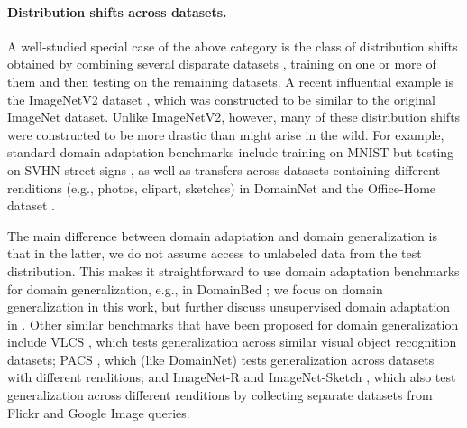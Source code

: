 \paragraph{Distribution shifts across datasets.} A well-studied special case of the above category is the class of distribution shifts obtained by combining several disparate datasets \citep{torralba2011unbiased}, training on one or more of them and then testing on the remaining datasets.
A recent influential example is the ImageNetV2 dataset \citep{recht2019doimagenet}, which was constructed to be similar to the original ImageNet dataset.
Unlike ImageNetV2, however, many of these distribution shifts were constructed to be more drastic than might arise in the wild.
For example, standard domain adaptation benchmarks include training on MNIST but testing on SVHN street signs \citep{lecun1998mnist,netzer2011reading,tzeng2017domain,hoffman2018cycada},
as well as transfers across datasets containing different renditions (e.g., photos, clipart, sketches) in DomainNet \citep{peng2019moment} and the Office-Home dataset \citep{venkateswara2017deep}.

The main difference between domain adaptation and domain generalization is that in the latter, we do not assume access to unlabeled data from the test distribution.
This makes it straightforward to use domain adaptation benchmarks for domain generalization, e.g., in DomainBed \citep{gulrajani2020search}; we focus on domain generalization in this work,
but further discuss unsupervised domain adaptation in .
Other similar benchmarks that have been proposed for domain generalization include VLCS \citep{fang2013unbiased}, which tests generalization across similar visual object recognition datasets; PACS \citep{li2017deeper}, which (like DomainNet) tests generalization across datasets with different renditions; and ImageNet-R \citep{hendrycks2020many} and ImageNet-Sketch \citep{wang2019learning}, which also test generalization across different renditions by collecting separate datasets from Flickr and Google Image queries.
